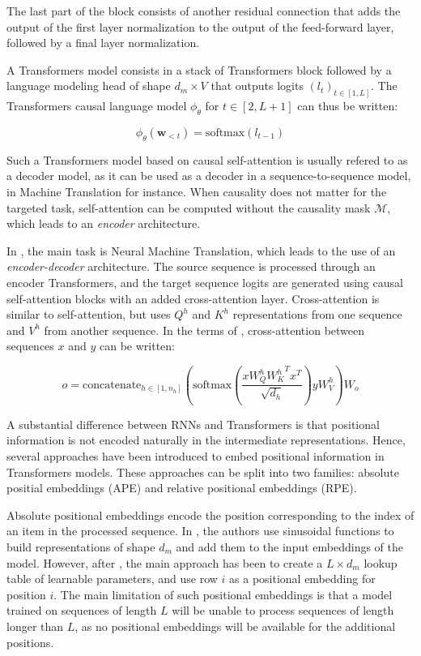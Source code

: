 The last part of the block consists of another residual connection that adds the output of the first layer normalization to the output of the feed-forward layer, followed by a final layer normalization.

A Transformers model consists in a stack of Transformers block followed by a language modeling head of shape $d_m \times V$ that outputs logits $(l_t)_{t \in [1, L]}$. The Transformers causal language model $\phi_\theta$ for $t \in [2, L+1]$ can thus be written:

$$
\phi_\theta(\mathbf{w}_{<t}) = \text{softmax} (l_{t-1})
$$

Such a Transformers model based on causal self-attention is usually refered to as a decoder model, as it can be used as a decoder in a sequence-to-sequence model, in Machine Translation for instance. When causality does not matter for the targeted task, self-attention can be computed without the causality mask $\mathcal{M}$, which leads to an \textit{encoder} architecture.

In \citet{vaswani2017attention}, the main task is Neural Machine Translation, which leads to the use of an \textit{encoder-decoder} architecture. The source sequence is processed through an encoder Transformers, and the target sequence logits are generated using causal self-attention blocks with an added cross-attention layer. Cross-attention is similar to self-attention, but uses $Q^h$ and $K^h$ representations from one sequence and $V^h$ from another sequence. In the terms of , cross-attention between sequences $x$ and $y$ can be written:

\begin{equation}
    \label{eq:causal_attn}
o = \text{concatenate}_{h\in [1, n_h]} \left( \text{softmax} \left(\frac{x W_Q^h {W_K^h}^T x^T}{\sqrt{d_h}}\right) y W_V^h \right) W_o
\end{equation}

A substantial difference between RNNs and Transformers is that positional information is not encoded naturally in the intermediate representations. Hence, several approaches have been introduced to embed positional information in Transformers models. These approaches can be split into two families: absolute positial embeddings (APE) and relative positional embeddings (RPE).

Absolute positional embeddings encode the position corresponding to the index of an item in the processed sequence. In \citet{vaswani2017attention}, the authors use sinusoidal functions to build representations of shape $d_m$ and add them to the input embeddings of the model. However, after \citet{devlin-etal-2019-bert}, the main approach has been to create a $L \times d_m$ lookup table of learnable parameters, and use row $i$ as a positional embedding for position $i$. The main limitation of such positional embeddings is that a model trained on sequences of length $L$ will be unable to process sequences of length longer than $L$, as no positional embeddings will be available for the additional positions.

